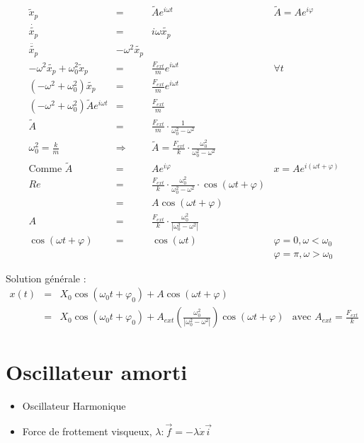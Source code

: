 \[\begin{array}{rccl}
		\tilde{x}_p &=& \tilde{A}e^{i\omega t} &\tilde{A} = A e^{i\varphi} \\
		\dot{\tilde{x_p}} &=& i \omega \tilde{x_p} \\
		\ddot{\tilde{x_p}} & -\omega^2 \tilde{x_p} \\
		-\omega^2 \tilde{x_p}+\omega_0^2\tilde{x}_p &=& \frac{F_{ext}}{m}e^{i\omega t} & \forall t \\
		(-\omega^2 + \omega_0^2)\tilde{x_p} &=& \frac{F_{ext}}{m} e^{i\omega t} \\
		(-\omega^2 + \omega_0^2) \tilde{A}e^{i\omega t} &=& \frac{F_{ext}}{m} \\
		\tilde{A} &=& \frac{F_{ext}}{m} \cdot \frac{1}{\omega_0^2 - \omega^2} \\
		\omega_0^2 = \frac{k}{m} & \Rightarrow & \tilde{A} = \frac{F_{ext}}{k}\cdot \frac{\omega_0^2}{\omega_0^2 - \omega^2} \\
		\text{Comme } \tilde{A} &=& Ae^{i\varphi} &  x = Ae^{i(\omega t + \varphi)}\\
		Re &=& \frac{F_{ext}}{k} \cdot \frac{\omega_0^2}{\omega_0^2 - \omega^2} \cdot \cos(\omega t + \varphi)\\
		   &=& A \cos(\omega t + \varphi) \\
		A &=&\frac{F_{ext}}{k} \cdot \frac{\omega_0^2}{|\omega_0^2 - \omega^2|} \\
		\cos(\omega t + \varphi) &=& \cos(\omega t) & \varphi = 0, \omega < \omega_0 \\
																					   &&& \varphi = \pi, \omega > \omega_0 \end{array}\]

		Solution générale :
		\[\begin{array}{rclr}
				x(t) &=& X_0\cos(\omega_0 t + \varphi_0) + A\cos(\omega t + \varphi) \\
						   &=& X_0\cos(\omega_0 t + \varphi_0) + A_{ext}(\frac{\omega_0^2}{|\omega_0^2 - \omega^2|}) \cos(\omega t + \varphi)& \text{avec } A_{ext} = \frac{F_{ext}}{k}
			\end{array}\]

	\section{Oscillateur amorti}

	\begin{itemize}
		\item Oscillateur Harmonique
		\item Force de frottement visqueux, $\lambda : \vec{f} = - \lambda \dot{x}\vec{i}$
	\end{itemize}

